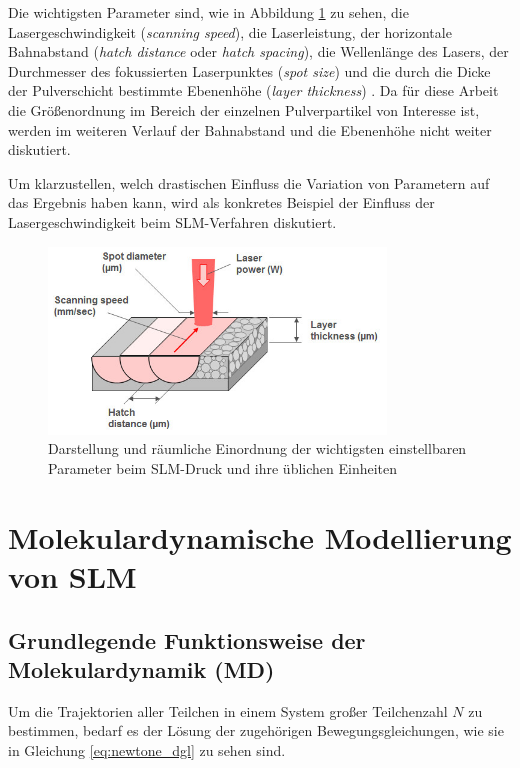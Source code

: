 		Die wichtigsten Parameter sind, wie in Abbildung \ref{fig:slm_parameters} zu sehen, die
		Lasergeschwindigkeit (\emph{scanning speed}), die Laserleistung, der horizontale
		Bahnabstand (\emph{hatch distance} oder \emph{hatch spacing}), die Wellenlänge des Lasers,
		der Durchmesser des fokussierten Laserpunktes (\emph{spot size}) und die durch die Dicke
		der Pulverschicht bestimmte Ebenenhöhe (\emph{layer thickness})
		\cite{sadali2020influence}. Da für diese Arbeit die Größenordnung im Bereich der einzelnen
		Pulverpartikel von Interesse ist, werden im weiteren Verlauf der Bahnabstand und die
		Ebenenhöhe nicht weiter diskutiert.

		Um klarzustellen, welch drastischen Einfluss die Variation von Parametern auf das Ergebnis
		haben kann, wird als konkretes Beispiel der Einfluss der Lasergeschwindigkeit beim
		SLM-Verfahren diskutiert.


		\begin{figure}[!ht]
			\centering
			\includegraphics[width=0.8\textwidth]{chapter/main/img/slm_parameters.jpg}
			\caption{Darstellung und räumliche Einordnung der wichtigsten einstellbaren Parameter
			beim SLM-Druck und ihre üblichen Einheiten \cite{saunders2017x}}
			\label{fig:slm_parameters}
		\end{figure}


\section{Molekulardynamische Modellierung von SLM}
	\subsection{Grundlegende Funktionsweise der Molekulardynamik (MD)}
		Um die Trajektorien aller Teilchen in einem System großer Teilchenzahl $N$ zu bestimmen,
		bedarf es der Lösung der zugehörigen Bewegungsgleichungen, wie sie in Gleichung
		\eqref{eq:newtone_dgl} zu sehen sind.

